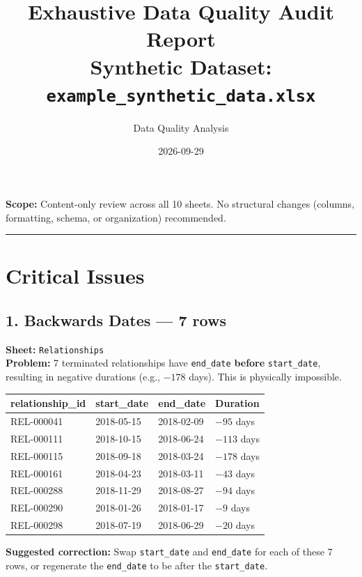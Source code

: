 \documentclass[11pt]{article}
\title{\textbf{Exhaustive Data Quality Audit Report}\\
\large Synthetic Dataset: \texttt{example\_synthetic\_data.xlsx}}
\author{Data Quality Analysis}
\date{2026-09-29}
\begin{document}
\maketitle

\noindent\textbf{Scope:} Content-only review across all 10 sheets. No structural changes (columns, formatting, schema, or organization) recommended.

\bigskip
\hrule
\bigskip

\section*{\textcolor{critred}{Critical Issues}}

\subsection*{1. Backwards Dates --- 7 rows}
\textbf{Sheet:} \texttt{Relationships}\\
\textbf{Problem:} 7 terminated relationships have \texttt{end\_date} \textbf{before} \texttt{start\_date}, resulting in negative durations (e.g., $-178$ days). This is physically impossible.

\begin{center}
\begin{tabular}{llll}
\toprule
\textbf{relationship\_id} & \textbf{start\_date} & \textbf{end\_date} & \textbf{Duration} \\
\midrule
REL-000041 & 2018-05-15 & 2018-02-09 & \textcolor{critred}{$-95$ days} \\
REL-000111 & 2018-10-15 & 2018-06-24 & \textcolor{critred}{$-113$ days} \\
REL-000115 & 2018-09-18 & 2018-03-24 & \textcolor{critred}{$-178$ days} \\
REL-000161 & 2018-04-23 & 2018-03-11 & \textcolor{critred}{$-43$ days} \\
REL-000288 & 2018-11-29 & 2018-08-27 & \textcolor{critred}{$-94$ days} \\
REL-000290 & 2018-01-26 & 2018-01-17 & \textcolor{critred}{$-9$ days} \\
REL-000298 & 2018-07-19 & 2018-06-29 & \textcolor{critred}{$-20$ days} \\
\bottomrule
\end{tabular}
\end{center}

\noindent\textbf{Suggested correction:} Swap \texttt{start\_date} and \texttt{end\_date} for each of these 7 rows, or regenerate the \texttt{end\_date} to be after the \texttt{start\_date}.
\end{document}
